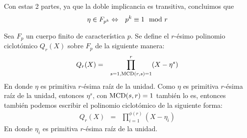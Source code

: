 	Con estas 2 partes, ya que la doble implicancia es transitiva, concluimos que 
	\begin{eqnarray}
		\eta \in F_{p^k} &\Leftrightarrow& p^k\equiv 1 \mod r\label{eq:propiedad}
	\end{eqnarray}	 
	
	\begin{definition}%
		Sea $F_p$ un cuerpo finito de caracterí­stica $p$. Se define el $r$-ésimo polinomio ciclotómico $Q_r(X)$ sobre $F_p$ de la siguiente manera:
		\begin{eqnarray}
			Q_r(X) &=& \prod_{s=1,{\rm MCD}(r,s)=1}^{r}(X-\eta^s)\nonumber
		\end{eqnarray}
		En donde $\eta$ es primitiva $r$-ésima raí­z de la unidad. 
		Como $\eta$ es primitiva $r$-ésima raí­z de la unidad, entonces $\eta^s$, con ${\rm MCD}(s,r)=1$ también lo es, entonces también podemos escribir el polinomio ciclotómico de la siguiente forma: 
		\begin{eqnarray}
			Q_r(X) &=& \prod_{i=1}^{\phi (r)}(X-\eta_i)\nonumber
		\end{eqnarray}
		En donde $\eta_i$ es primitiva $r$-ésima raí­z de la unidad.
	\end{definition} 	
		
